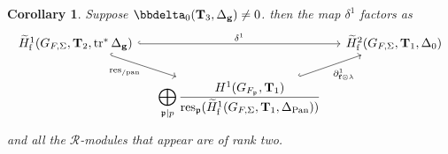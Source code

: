 \documentclass[10pt]{amsart}
\numberwithin{equation}{section}
\newtheorem{cor}[thm]{Corollary}
\theoremstyle{definition}
\theoremstyle{remark} %
\newcommand{\pan}{\mathrm{Pan}}
\DeclareMathOperator{\res}{res}
\newcommand{\f}{\mathbf{f}}
\newcommand{\g}{\mathbf{g}}
\newcommand{\p}{\mathfrak{p}}
\newcommand{\R}{\mathcal{R}}
\newcommand{\T}{\mathbf{T}}
\begin{document}
		\begin{cor}
			\label{cor : delta_and_delta}
			Suppose $\bbdelta_0(\T_{3},\Delta_{\g}) \ne 0 $. then the map $ \delta^1 $ factors as 
			\begin{equation}
				\begin{tikzcd}[column sep = small]
					\widetilde{H}^1_{\mathrm{f}}(G_{F,\Sigma}, \T_2, \operatorname{tr}^*\Delta_{\g}) \arrow[rr, hookrightarrow, "\delta^1"] \arrow[dr, hookrightarrow,"\res_{/\mathrm{pan}}" ']&&\widetilde{H}^2_{\mathrm{f}}(G_{F,\Sigma}, \T_1, \Delta_{0})\\
					&\smashoperator[r]{\bigoplus_{\p \mid p}}\frac{H^1(G_{F_{\p}}, \T_{1})}{\res_{\p}(\widetilde{H}^1_{\mathrm{f}}(G_{F,\Sigma},\T_{1}, \Delta_{\pan}))} 
					\arrow[ur, hookrightarrow, "\partial_{\f \otimes \lambda}^1" '] &
				\end{tikzcd}
			\end{equation}
			and all the $ \R $-modules that appear are of rank two.
		\end{cor}
		
\end{document}
